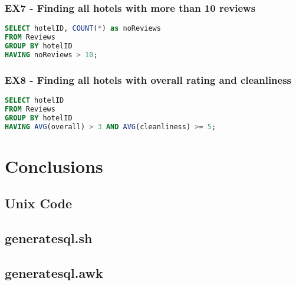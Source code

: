 \documentclass[a4paper]{article}
\begin{document}
\subsubsection{EX7 - Finding all hotels with more than 10 reviews}
\begin{lstlisting}[language=SQL, style=default]
SELECT hotelID, COUNT(*) as noReviews
FROM Reviews
GROUP BY hotelID
HAVING noReviews > 10;
\end{lstlisting}
\subsubsection{EX8 - Finding all hotels with overall rating and cleanliness}
\begin{lstlisting}[language=SQL, style=default]
SELECT hotelID
FROM Reviews
GROUP BY hotelID
HAVING AVG(overall) > 3 AND AVG(cleanliness) >= 5;
\end{lstlisting}

\section{Conclusions}

\begin{appendices}
\section{Unix Code}
\subsection{generatesql.sh}
\label{appendix:unix_code_sh}

\subsection{generatesql.awk}
\label{appendix:unix_code_awk}

\end{appendices}
\end{document}
